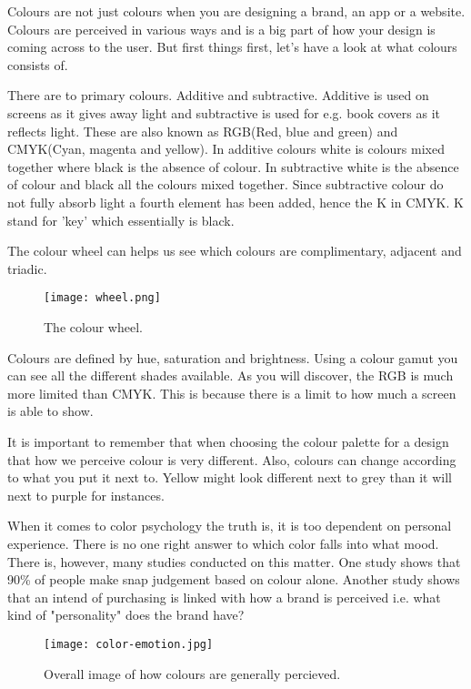 Colours are not just colours when you are designing a brand, an app or a website. Colours are perceived in various ways and is a big part of how your design is coming  across to the user. \cite{Colormeaning}
But first things first, let's have a look at what colours consists of.

There are to primary colours. Additive and subtractive. Additive is used on screens as it gives away light and subtractive is used for e.g. book covers as it reflects light. \cite{Colour}
These are also known as RGB(Red, blue and green) and CMYK(Cyan, magenta and yellow).
In additive colours white is colours mixed together where black is the absence of colour. In subtractive white is the absence of colour and black all the colours mixed together. 
Since subtractive colour do not fully absorb light a fourth element has been added, hence the K in CMYK. K stand for 'key' which essentially is black.\cite{Colour}

The colour wheel can helps us see which colours are complimentary, adjacent and triadic. 
\begin{figure}[H]
\centering
\texttt{[image: wheel.png]}
\caption{The colour wheel. \cite{Colour}}
\end{figure}

Colours are defined by hue, saturation and brightness. 
Using a colour gamut you can see all the different shades available. As you will discover, the RGB is much more limited than CMYK. This is because there is a limit to how much a screen is able to show. 

It is important to remember that when choosing the colour palette for a design that how we perceive colour is very different. Also, colours can change according to what you put it next to. Yellow might look different next to grey than it will next to purple for instances. \cite{Colour}

When it comes to color psychology the truth is, it is too dependent on personal experience. There is no one right answer to which color falls into what mood. \cite{ColorMeaning}
There is, however, many studies conducted on this matter. 
One study shows that 90\% of people make snap judgement based on colour alone. \cite{ColorMeaning} Another study shows that an intend of purchasing is linked with how a brand is perceived i.e. what kind of "personality" does the brand have?\cite{ColorMeaning}

\begin{figure}[H]
\centering
\texttt{[image: color-emotion.jpg]}
\caption{Overall image of how colours are generally percieved. \cite{ColorMeaning}}
\end{figure}


